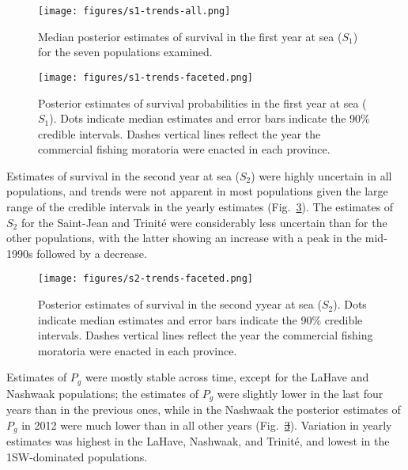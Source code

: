 \documentclass[12pt]{article}
\newcommand{\So}{$S_{1}$\xspace}
\newcommand{\St}{$S_{2}$\xspace}
\newcommand{\Pg}{$P_g$\xspace}
\providecommand{\DIFaddtex}[1]{{\protect\color{blue}\uwave{#1}}} %
\providecommand{\DIFdeltex}[1]{{\protect\color{red}\sout{#1}}}                      %
\providecommand{\DIFaddbegin}{} %
\providecommand{\DIFaddend}{} %
\providecommand{\DIFdelbegin}{} %
\providecommand{\DIFdelend}{} %
\providecommand{\DIFadd}[1]{\texorpdfstring{\DIFaddtex{#1}}{#1}} %
\providecommand{\DIFdel}[1]{\texorpdfstring{\DIFdeltex{#1}}{}} %
\begin{document}

\begin{figure}[htbp] \centering
    \texttt{[image: figures/s1-trends-all.png]}
    \caption{Median posterior estimates of survival in the first year at sea (\So)
        for the seven populations examined.} \label{fig:s1-dual}
\end{figure}
\begin{figure}[htbp] \centering
    \texttt{[image: figures/s1-trends-faceted.png]}
    \caption{Posterior estimates of survival probabilities in the first year at sea (\So). Dots indicate median estimates and error
        bars indicate the 90\% credible intervals. Dashes vertical lines reflect the year the commercial fishing moratoria were enacted
    in each province.} \label{fig:s1-faceted}
\end{figure}
Estimates of survival in the second year at sea (\St) were highly uncertain in all populations, and trends
were not apparent in most populations given the large range of the credible
intervals in the yearly estimates (Fig.~\ref{fig:s2-faceted}). The estimates
of \St for the Saint-Jean and Trinit\'{e} were considerably less uncertain
than for the other populations, with the latter showing an increase with a peak in the mid-1990s followed
by a decrease.

\begin{figure}[htbp] \centering
    \texttt{[image: figures/s2-trends-faceted.png]}
    \caption{Posterior estimates of survival in the second yyear at sea (\St).
 Dots indicate median estimates and error bars indicate the 90\% credible
 intervals. Dashes vertical lines reflect the year the commercial fishing
 moratoria were enacted in each province.} \label{fig:s2-faceted}
\end{figure}
Estimates of \Pg were mostly stable across time, except for the LaHave and
Nashwaak populations; \DIFaddbegin \DIFadd{for the La Have }\DIFaddend the estimates of \Pg were slightly lower in the last
four years than in the previous ones, while in the Nashwaak the posterior
estimates of \Pg in 2012 were much lower than in all other years
(Fig.~\DIFdelbegin \DIFdel{\ref{fig:s2-faceted}}\DIFdelend \DIFaddbegin \DIFadd{\ref{fig:pr-faceted}}\DIFaddend ). Variation in yearly estimates was highest in the
LaHave, Nashwaak, and Trinit\'{e}, and lowest in the 1SW-dominated
populations.
\end{document}
